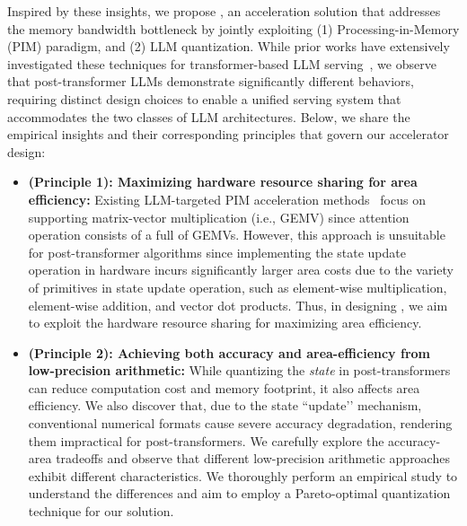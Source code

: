 %
Inspired by these insights, we propose \sysname{}, an acceleration
solution that addresses the memory bandwidth bottleneck by jointly
exploiting (1) Processing-in-Memory (PIM) paradigm, and (2) LLM quantization.
%
While prior works have extensively investigated these techniques for
transformer-based LLM serving~\cite{xiao2023smoothquant,
  hooper2024kvquant, monkey, atom, heo2024neupims,
park2024attacc,ianus}, we observe that post-transformer LLMs
demonstrate significantly different behaviors, requiring distinct
design choices to enable a unified serving system that accommodates
the two classes of LLM architectures.
%
Below, we share the empirical insights and their corresponding
principles that govern our accelerator design:
%
\begin{itemize}[labelindent=0.5em,nolistsep,leftmargin=1.0em]
  \item \textbf{(Principle 1): Maximizing hardware resource sharing
    for area efficiency:}
    Existing LLM-targeted PIM acceleration methods~\cite{hbm_pim,
    newton, heo2024neupims, park2024attacc, ianus} focus on
    supporting matrix-vector multiplication (i.e., GEMV) since
    attention operation consists of a full of GEMVs.
    However, this approach is unsuitable for post-transformer
    algorithms since implementing the state update operation in
    hardware incurs significantly larger area costs due to the
    variety of primitives in state update operation, such as
    element-wise multiplication, element-wise addition, and vector dot products.
    Thus, in designing \sysname{}, we aim to exploit the hardware
    resource sharing for maximizing area efficiency.
  \item \textbf{(Principle 2): Achieving both accuracy and
    area-efficiency from low-precision arithmetic:}
    While quantizing the \emph{state} in post-transformers can reduce
    computation cost and memory footprint, it also affects area efficiency.
    We also discover that, due to the state ``update’’ mechanism,
    conventional numerical formats cause severe accuracy degradation,
    rendering them impractical for post-transformers.
    We carefully explore the accuracy-area tradeoffs and observe that
    different low-precision arithmetic approaches exhibit different
    characteristics.
    We thoroughly perform an empirical study to understand the
    differences and aim to employ a Pareto-optimal quantization
    technique for our solution.
\end{itemize}
%

